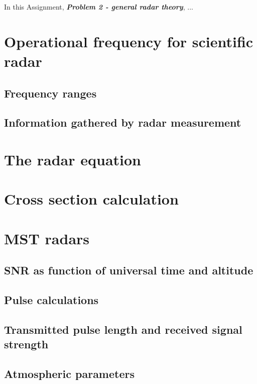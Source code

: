 

In this Assignment, \textit{\textbf{Problem 2 - general radar theory}}, ...


\section{Operational frequency for scientific radar}

\subsection{Frequency ranges}

\subsection{Information gathered by radar measurement}



\section{The radar equation}



\section{Cross section calculation}



\section{MST radars}

\subsection{SNR as function of universal time and altitude}

\subsection{Pulse calculations}

\subsection{Transmitted pulse length and received signal strength}

\subsection{Atmospheric parameters}